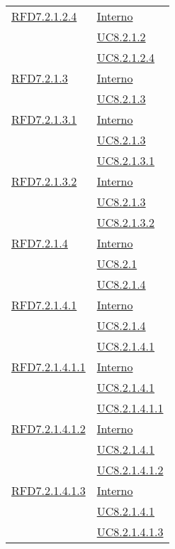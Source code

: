 \begin{longtable}{|>{\centering}m{5cm}|m{5cm}<{\centering}|}
\hyperlink{RFD7.2.1.2.4}{RFD7.2.1.2.4} & \hyperlink{Interno}{Interno}\\
& \hyperref[UC8.2.1.2]{UC8.2.1.2}\\
& \hyperref[UC8.2.1.2.4]{UC8.2.1.2.4}\\ \hline

\hyperlink{RFD7.2.1.3}{RFD7.2.1.3} & \hyperlink{Interno}{Interno}\\
& \hyperref[UC8.2.1.3]{UC8.2.1.3}\\ \hline

\hyperlink{RFD7.2.1.3.1}{RFD7.2.1.3.1} & \hyperlink{Interno}{Interno}\\
& \hyperref[UC8.2.1.3]{UC8.2.1.3}\\
& \hyperref[UC8.2.1.3.1]{UC8.2.1.3.1}\\ \hline

\hyperlink{RFD7.2.1.3.2}{RFD7.2.1.3.2} & \hyperlink{Interno}{Interno}\\
& \hyperref[UC8.2.1.3]{UC8.2.1.3}\\
& \hyperref[UC8.2.1.3.2]{UC8.2.1.3.2}\\ \hline

\hyperlink{RFD7.2.1.4}{RFD7.2.1.4} & \hyperlink{Interno}{Interno}\\
& \hyperref[UC8.2.1]{UC8.2.1}\\
& \hyperref[UC8.2.1.4]{UC8.2.1.4}\\ \hline

\hyperlink{RFD7.2.1.4.1}{RFD7.2.1.4.1} & \hyperlink{Interno}{Interno}\\
& \hyperref[UC8.2.1.4]{UC8.2.1.4}\\
& \hyperref[UC8.2.1.4.1]{UC8.2.1.4.1}\\ \hline

\hyperlink{RFD7.2.1.4.1.1}{RFD7.2.1.4.1.1} & \hyperlink{Interno}{Interno}\\
& \hyperref[UC8.2.1.4.1]{UC8.2.1.4.1}\\
& \hyperref[UC8.2.1.4.1.1]{UC8.2.1.4.1.1}\\ \hline

\hyperlink{RFD7.2.1.4.1.2}{RFD7.2.1.4.1.2} & \hyperlink{Interno}{Interno}\\
& \hyperref[UC8.2.1.4.1]{UC8.2.1.4.1}\\
& \hyperref[UC8.2.1.4.1.2]{UC8.2.1.4.1.2}\\ \hline

\hyperlink{RFD7.2.1.4.1.3}{RFD7.2.1.4.1.3} & \hyperlink{Interno}{Interno}\\
& \hyperref[UC8.2.1.4.1]{UC8.2.1.4.1}\\
& \hyperref[UC8.2.1.4.1.3]{UC8.2.1.4.1.3}\\ \hline


\end{longtable}
